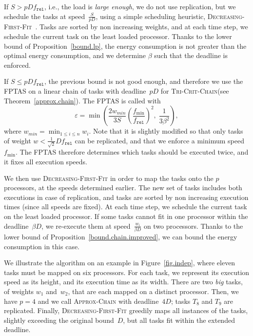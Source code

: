 \documentclass[a4paper]{article}
\theoremstyle{plain}
\theoremstyle{definition}
\theoremstyle{remark}
\newcommand{\fmin}{\ensuremath{f_{\min}}\xspace}
\newcommand{\fr}{\ensuremath{f_{\texttt{rel}}}\xspace}
\newcommand{\dff}{\textsc{Dec\-reasing-First-Fit}\xspace}
\newcommand{\approxchain}{\textsc{Ap\-prox-Chain}}
\newcommand{\chain}{\textsc{Tri-Crit-Chain}\xspace}
\begin{document}
\begin{compactitem}


\item If ${S} > pD \fr $, i.e., the load is {\em large enough}, we do not use replication, but we
  schedule the tasks at
  speed~$\frac{S}{pD}$, using a simple scheduling heuristic, \dff~\cite{Graham69}. Tasks
  are sorted by non increasing weights, and at each time step, we
  schedule the current task on the least loaded processor. Thanks to
  the lower bound of Proposition~\ref{bound.lp}, the energy
  consumption is not greater than the optimal energy consumption, and
  we determine $\beta$ such that the deadline is
  enforced.  

\item If $S\leq p D \fr$, the previous bound is not good enough, and therefore we use the
  FPTAS on a linear chain of tasks with deadline~$pD$ for \chain (see
  Theorem~\ref{approx.chain}).  The FPTAS is called with
  \begin{equation}
\label{def.epsilon}
\varepsilon=\min\left(\frac{2w_{min}}{3S}\left(\frac{\fmin}{\fr}\right)^2,\;
    \frac{1}{3\beta^2}\right), 
\end{equation}
  where $w_{min} = \min_{1\leq i \leq n} w_i$. Note that it is
  slightly modified so that only tasks of weight
  $w<\frac{1}{\sqrt{2}}D\fr$ can be replicated, and that we enforce a
  minimum speed~$\fmin$.  The FPTAS therefore determines which tasks
  should be executed twice, and it fixes all execution speeds.
   
  We then use \dff in order to map the tasks onto the $p$ processors,
  at the speeds determined earlier. The new set of tasks includes both
  executions in case of replication, and tasks are sorted by non
  increasing execution times (since all speeds are fixed). At each
  time step, we schedule the current task on the least loaded
  processor. If some tasks cannot fit in one processor within the
  deadline~$\beta D$, we re-execute them at speed~$\frac{w_i}{\beta
    D}$ on two processors. Thanks to the lower bound of
  Proposition~\ref{bound.chain.improved}, we can bound the energy
  consumption in this case.
\end{compactitem}

\medskip
\noindent We illustrate the algorithm on an example in
Figure~\ref{fig.indep}, where eleven tasks must be mapped on six
processors. For each task, we represent its execution speed as its
height, and its execution time as its width. There are two {\em big}
tasks, of weights $w_1$ and~$w_2$, that are each mapped on a distinct
processor. Then, we have $p=4$ and we call \approxchain\xspace with
deadline~$4D$; tasks $T_8$ and $T_9$ are replicated. Finally, \dff
greedily maps all instances of the tasks, slightly exceeding the
original bound~$D$, but all tasks fit within the extended deadline.
\end{document}
